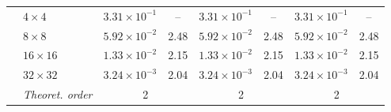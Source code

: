 \documentclass[11pt,a4paper]{article}
\numberwithin{equation}{section}
\theoremstyle{plain}
\theoremstyle{definition}
\theoremstyle{remark}
\begin{document}
\begin{table}[htbp]
\begin{tabular}{llcc|cc|cc}
\addlinespace
\multirow{5}{*}{Pressure}
& $4\times4$   & $3.31\times10^{-1}$ & --   & $3.31\times10^{-1}$ & --   & $3.31\times10^{-1}$ & --   \\
& $8\times8$   & $5.92\times10^{-2}$ & 2.48 & $5.92\times10^{-2}$ & 2.48 & $5.92\times10^{-2}$ & 2.48 \\
& $16\times16$ & $1.33\times10^{-2}$ & 2.15 & $1.33\times10^{-2}$ & 2.15 & $1.33\times10^{-2}$ & 2.15 \\
& $32\times32$ & $3.24\times10^{-3}$ & 2.04 & $3.24\times10^{-3}$ & 2.04 & $3.24\times10^{-3}$ & 2.04 \\
& \textit{Theoret. order}
& \multicolumn{2}{c|}{2}
& \multicolumn{2}{c|}{2}
& \multicolumn{2}{c}{2} \\

\bottomrule
\end{tabular}
\end{table}
\end{document}
